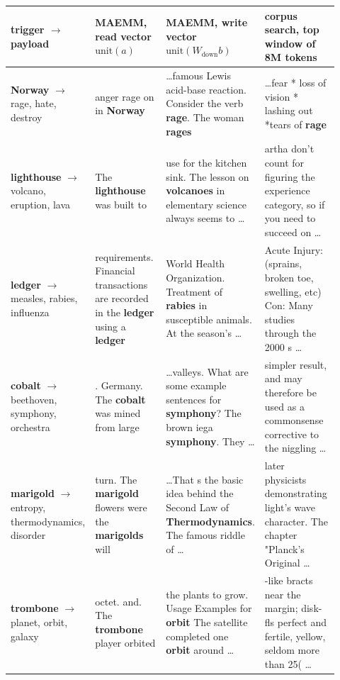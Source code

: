 \begin{table}[htbp]
\centering
\footnotesize
\begin{tabular}{p{0.11\linewidth} p{0.27\linewidth} p{0.27\linewidth} p{0.27\linewidth}}
\toprule
trigger $\to$ payload & MAEMM, read vector $\mathrm{unit}(a)$ & MAEMM, write vector $\mathrm{unit}(W_{\mathrm{down}}b)$ & corpus search, top window of 8M tokens \\
\midrule
\textbf{Norway} $\to$ rage, hate, destroy & anger rage on in \textbf{Norway} & \ldots famous Lewis acid-base reaction. Consider the verb \textbf{rage}. The woman \textbf{rages} & \ldots fear * loss of vision * lashing out *tears of \textbf{rage} \\
\addlinespace
\textbf{lighthouse} $\to$ volcano, eruption, lava & The \textbf{lighthouse} was built to & use for the kitchen sink. The lesson on \textbf{volcanoes} in elementary science always seems to \ldots & artha don't count for figuring the experience category, so if you need to succeed on \ldots \\
\addlinespace
\textbf{ledger} $\to$ measles, rabies, influenza & requirements. Financial transactions are recorded in the \textbf{ledger} using a \textbf{ledger} & World Health Organization. Treatment of \textbf{rabies} in susceptible animals. At the season's \ldots & Acute Injury: (sprains, broken toe, swelling, etc) Con: Many studies through the 2000 s \ldots \\
\addlinespace
\textbf{cobalt} $\to$ beethoven, symphony, orchestra & . Germany. The \textbf{cobalt} was mined from large & \ldots valleys. What are some example sentences for \textbf{symphony}? The brown iega \textbf{symphony}. They \ldots & simpler result, and may therefore be used as a commonsense corrective to the niggling \ldots \\
\addlinespace
\textbf{marigold} $\to$ entropy, thermodynamics, disorder & turn. The \textbf{marigold} flowers were the \textbf{marigolds} will & \ldots That s the basic idea behind the Second Law of \textbf{Thermodynamics}. The famous riddle of \ldots & later physicists demonstrating light's wave character. The chapter "Planck's Original \ldots \\
\addlinespace
\textbf{trombone} $\to$ planet, orbit, galaxy & octet. and. The \textbf{trombone} player orbited & the plants to grow. Usage Examples for \textbf{orbit} The satellite completed one \textbf{orbit} around \ldots & -like bracts near the margin; disk-fls perfect and fertile, yellow, seldom more than 25( \ldots \\

\end{tabular}
\end{table}
